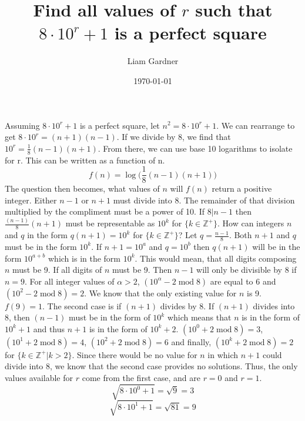 \documentclass[a4paper, 12pt]{article}
\begin{document}
\title{Find all values of $r$ such that $8\cdot10^r+1$ is a perfect square}
\author{Liam Gardner}
\date{\today}
\maketitle
\newcommand{\Mod}[2]{({#1}\operatorname{ mod } {#2})}
Assuming $8\cdot10^r+1$ is a perfect square, let $n^2 = 8\cdot10^r+1$. We can rearrange to get $8\cdot10^r = (n+1)(n-1)$.
If we divide by $8$, we find that $10^r = \frac{1}{8}(n-1)(n+1)$. From there, we can use base 10 logarithms to isolate for r. This can be written as a function of n.
\begin{equation}
f(n) = \log\Big(\frac{1}{8}(n-1)(n+1)\Big)
\end{equation}
The question then becomes, what values of $n$ will $f(n)$ return a positive integer. Either $n-1$ or $n+1$ must divide into 8. The remainder of that division multiplied by the compliment must be a power of 10. If $8 | n-1$ then $\frac{(n-1)}{8}(n+1)$ must be representable as $10^k$ for $\{k \in \mathbb{Z}^+\}$.
\newline
How can integers $n$ and $q$ in the form $q(n+1) = 10^k$ for $\{k \in \mathbb{Z}^+\}$?
\newline
Let $q = \frac{n-1}{8}$.
\newline
Both $n+1$ and $q$ must be in the form $10^k$. If $n+1=10^a$ and $q = 10^b$ then $q(n+1)$ will be in the form $10^{a+b}$ which is in the form $10^k$. This would mean, that all digits composing $n$ must be 9. If all digits of $n$ must be 9. Then $n-1$ will only be divisible by 8 if $n=9$. For all integer values of $\alpha>2$, $\Mod{10^\alpha-2}{8}$ are equal to 6 and $\Mod{10^2-2}{8} = 2$. We know that the only existing value for $n$ is 9. $f(9) = 1$. 
\newline
The second case is if $(n+1)$ divides by 8. If $(n+1)$ divides into 8, then $(n-1)$ must be in the form of $10^k$ which means that $n$ is in the form of $10^k + 1$ and thus $n+1$ is in the form of $10^k+2$. $\Mod{10^0 + 2}{8} = 3$, $\Mod{10^1+2}{8} = 4$, $\Mod{10^2+2}{8}=6$ and finally, 
$\Mod{10^k+2}{8} = 2$ for $\{k \in \mathbb{Z^+} | k > 2\}$. Since there would be no value for $n$ in which $n+1$ could divide into 8, we know that the second case provides no solutions. Thus, the only values available for $r$ come from the first case, and are $r=0$ and $r=1$.
\newline
$$\sqrt{8\cdot10^0 + 1} = \sqrt{9} = 3$$
$$\sqrt{8\cdot10^1 + 1}  = \sqrt{81} = 9$$
\end{document}

